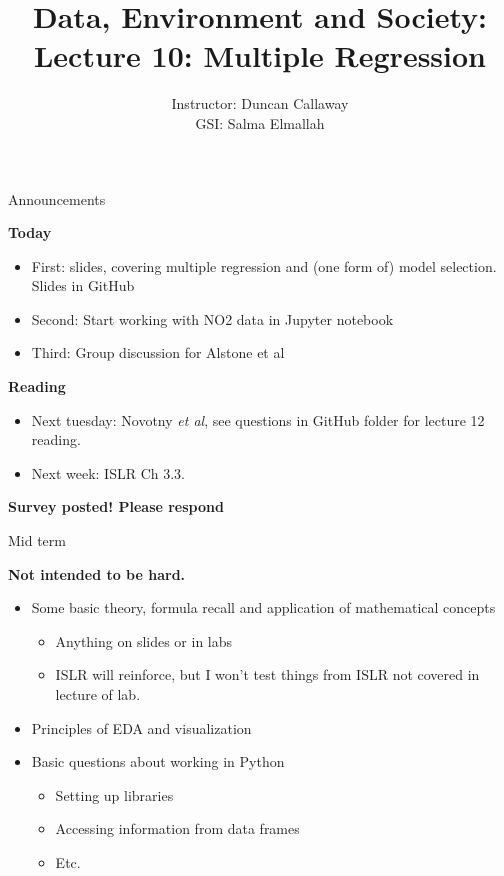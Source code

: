 \documentclass[aspectratio=169]{beamer}
\title[Lecture 10: Multiple Regression] %
{Data, Environment and Society: \\{Lecture 10: Multiple Regression}}
\author[ER131: Data, Environment and Society] 
{Instructor: Duncan Callaway\\
GSI: Salma Elmallah}
\institute[UC Berkeley] %
 {\small{ \bf October 1, 2019}}
\date[October 1, 2019]
\begin{document}
\begin{frame}
  \titlepage
\end{frame}

\begin{frame}{Announcements}

\textbf{Today}
\begin{itemize}
\item First: slides, covering multiple regression and (one form of) model selection.  Slides in GitHub
\item Second: Start working with NO2 data in Jupyter notebook
\item Third: Group discussion for Alstone et al
\end{itemize}

\textbf{Reading}
\begin{itemize}
\item Next tuesday: Novotny \textit{et al}, see questions in GitHub folder for lecture 12 reading.
\item Next week: ISLR Ch 3.3.
\end{itemize}

\textbf{Survey posted!  Please respond}
\end{frame}


\begin{frame}{Mid term}

\textbf{Not intended to be hard.  }
\begin{itemize}
\item Some basic theory, formula recall and application of mathematical concepts
\begin{itemize}
\item Anything on slides or in labs
\item ISLR will reinforce, but I won't test things from ISLR not covered in lecture of lab.
\end{itemize}
\item Principles of EDA and visualization
\item Basic questions about working in Python
\begin{itemize}
\item Setting up libraries
\item Accessing information from data frames
\item Etc.  
\end{itemize}
\end{itemize}

\end{frame}
\end{document}
